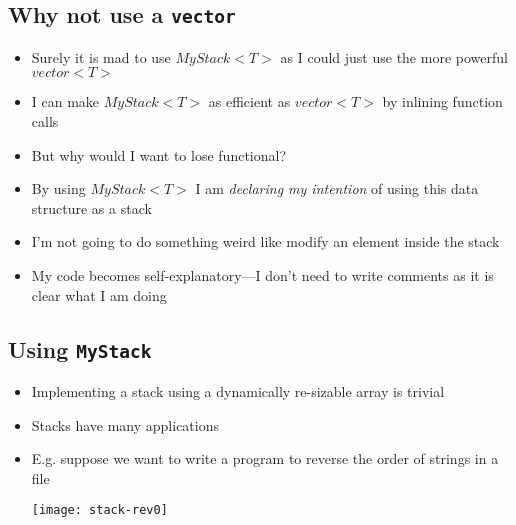 
\begin{slide}
\section[-2]{Why not use a \texttt{vector}}
  
\begin{PauseHighLight}
  \begin{itemize}
  \item Surely it is mad to use \jl$MyStack<T>$ as I could just use
    the more powerful \jl$vector<T>$\pause
  \item I can make \jl$MyStack<T>$ as efficient as \jl$vector<T>$ by
    inlining function calls\pause
  \item But why would I want to lose functional?\pause
  \item By using \jl$MyStack<T>$ I am \emph{declaring my intention} of using
    this data structure as a stack\pause
  \item I'm not going to do something weird like modify an element
    inside the stack\pause
  \item My code becomes self-explanatory\pause---I don't need to write
    comments as it is clear what I am doing\pauseb
  \end{itemize}
\end{PauseHighLight}

\end{slide}



\begin{slide}
\section{Using \texttt{MyStack}}
\pb

  \begin{itemize}
  \item Implementing a stack using a dynamically re-sizable array is
    trivial\pause
  \item Stacks have many applications\pause
  \item E.g. suppose we want to write a program to reverse the order of
    strings in a file\pause
\begin{center}
  \texttt{[image: stack-rev0]}
\end{center}

  \end{itemize}

\end{slide}


